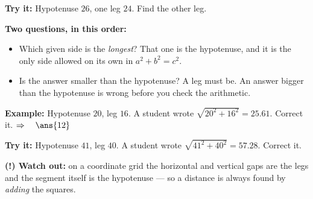 \documentclass[12pt]{article}
\begin{document}
\begin{tryitbox}
\textbf{Try it:} \quad Hypotenuse $26$, one leg $24$. Find the other leg.\\[2pt]
\end{tryitbox}


\begin{formulabox}
\textbf{Two questions, in this order:}
\begin{itemize}[leftmargin=1.3cm, itemsep=1pt, topsep=2pt]
  \item Which given side is the \textit{longest}? That one is the hypotenuse, and it is the only side allowed on its own in $a^2 + b^2 = c^2$.
  \item Is the answer smaller than the hypotenuse? A leg must be. An answer bigger than the hypotenuse is wrong before you check the arithmetic.
\end{itemize}
\end{formulabox}

\begin{examplebox}
\textbf{Example:} \quad Hypotenuse $20$, leg $16$. A student wrote $\sqrt{20^2 + 16^2} = 25.61$.
Correct it.
$\Rightarrow\quad \ans{12}$
\end{examplebox}

\begin{tryitbox}
\textbf{Try it:} \quad Hypotenuse $41$, leg $40$. A student wrote $\sqrt{41^2 + 40^2} = 57.28$.
Correct it.\\[2pt]
\end{tryitbox}

\begin{watchoutbox}
\textbf{(!) Watch out:} on a coordinate grid the horizontal and vertical gaps are the legs and
the segment itself is the hypotenuse --- so a distance is always found by \textit{adding} the
squares.
\end{watchoutbox}
\end{document}
